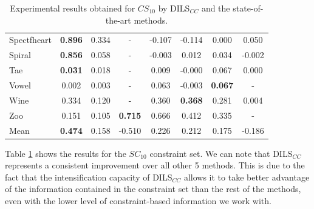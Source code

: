 \documentclass[review]{elsarticle}
\begin{document}
\begin{table}[!h]
{\begin{tabular}{lccccccc}
			Spectfheart & \textbf{0.896} & 0.334 & - & -0.107 & -0.114 & 0.000 & 0.050 \\
			Spiral & \textbf{0.856} & 0.058 & - & -0.003 & 0.012 & 0.034 & -0.002 \\
			Tae & \textbf{0.031} & 0.018 & - & 0.009 & -0.000 & 0.067 & 0.000 \\
			Vowel & 0.002 & 0.003 & - & 0.063 & -0.003 & \textbf{0.067} & - \\
			Wine & 0.334 & 0.120 & - & 0.360 & \textbf{0.368} & 0.281 & 0.004 \\
			Zoo & 0.151 & 0.105 & \textbf{0.715} & 0.666 & 0.412 & 0.335 & - \\
			\hline
			Mean & \textbf{0.474} & 0.158 & -0.510 & 0.226 & 0.212 & 0.175 & -0.186 \\
			\hline
			
		\end{tabular}}
		
	\caption{Experimental results obtained for $CS_{10}$ by DILS$_{CC}$ and the state-of-the-art methods.}
	\label{tab:results10}
\end{table}

Table \ref{tab:results10} shows the results for the $SC_{10}$ constraint set. We can note that DILS$_{CC}$ represents a consistent improvement over all other 5 methods. This is due to the fact that the intensification capacity of DILS$_{CC}$ allows it to take better advantage of the information contained in the constraint set than the rest of the methods, even with the lower level of constraint-based information we work with.
\end{document}
